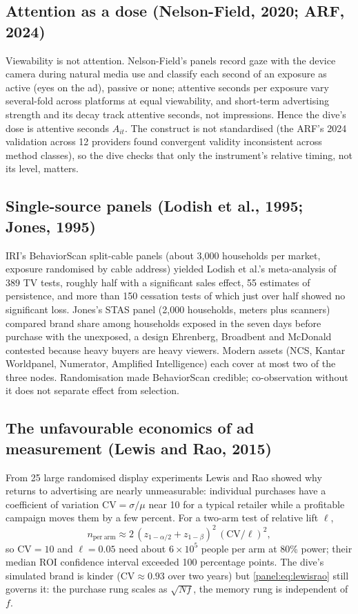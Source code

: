 \subsection{Attention as a dose (Nelson-Field, 2020; ARF, 2024)}

Viewability is not attention. Nelson-Field's panels record gaze with the device camera during natural media use and classify each second of an exposure as active (eyes on the ad), passive or none; attentive seconds per exposure vary several-fold across platforms at equal viewability, and short-term advertising strength and its decay track attentive seconds, not impressions. Hence the dive's dose is attentive seconds $A_{it}$. The construct is not standardised (the ARF's 2024 validation across 12 providers found convergent validity inconsistent across method classes), so the dive checks that only the instrument's relative timing, not its level, matters.

\subsection{Single-source panels (Lodish et al., 1995; Jones, 1995)}

IRI's BehaviorScan split-cable panels (about 3,000 households per market, exposure randomised by cable address) yielded Lodish et al.'s meta-analysis of 389 TV tests, roughly half with a significant sales effect, 55 estimates of persistence, and more than 150 cessation tests of which just over half showed no significant loss. Jones's STAS panel (2,000 households, meters plus scanners) compared brand share among households exposed in the seven days before purchase with the unexposed, a design Ehrenberg, Broadbent and McDonald contested because heavy buyers are heavy viewers. Modern assets (NCS, Kantar Worldpanel, Numerator, Amplified Intelligence) each cover at most two of the three nodes. Randomisation made BehaviorScan credible; co-observation without it does not separate effect from selection.

\subsection{The unfavourable economics of ad measurement (Lewis and Rao, 2015)}

From 25 large randomised display experiments Lewis and Rao showed why returns to advertising are nearly unmeasurable: individual purchases have a coefficient of variation $\mathrm{CV} = \sigma/\mu$ near 10 for a typical retailer while a profitable campaign moves them by a few percent. For a two-arm test of relative lift $\ell$,
\begin{equation}
n_{\mathrm{per\ arm}} \approx 2\,(z_{1-\alpha/2} + z_{1-\beta})^2\,(\mathrm{CV}/\ell)^2,
\label{panel:eq:lewisrao}
\end{equation}
so $\mathrm{CV} = 10$ and $\ell = 0.05$ need about $6 \times 10^{5}$ people per arm at 80\% power; their median ROI confidence interval exceeded 100 percentage points. The dive's simulated brand is kinder ($\mathrm{CV} \approx 0.93$ over two years) but \cref{panel:eq:lewisrao} still governs it: the purchase rung scales as $\sqrt{Nf}$, the memory rung is independent of $f$.

